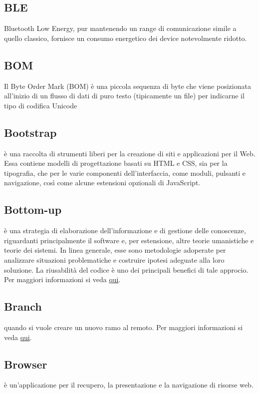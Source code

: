\documentclass[12pt,a4paper]{article}
\begin{document}
\subsection{BLE}
 Bluetooth Low Energy,  pur mantenendo un range di comunicazione simile a quello classico, fornisce un  consumo energetico dei device notevolmente ridotto.
 
 \subsection{BOM}
 Il Byte Order Mark (BOM) è una piccola sequenza di byte che viene posizionata all'inizio di un flusso di dati di puro testo (tipicamente un file) per indicarne il tipo di codifica Unicode

\subsection{Bootstrap}
è una raccolta di strumenti liberi per la creazione di siti e applicazioni per il Web. Essa contiene modelli di progettazione basati su HTML e CSS, sia per la tipografia, che per le varie componenti dell'interfaccia, come moduli, pulsanti e navigazione, così come alcune estensioni opzionali di JavaScript. 

\subsection{Bottom-up}
è una strategia di elaborazione dell'informazione e di gestione delle conoscenze, riguardanti principalmente il software e, per estensione, altre teorie umanistiche e teorie dei sistemi. In linea generale, esse sono metodologie adoperate per analizzare situazioni problematiche e costruire ipotesi adeguate alla loro soluzione. La riusabilità del codice è uno dei principali benefici di tale approcio. Per maggiori informazioni si veda \href{https://it.wikipedia.org/wiki/Progettazione_top-down_e_bottom-up}{qui}.

\subsection{Branch}
 quando si vuole creare un nuovo ramo al  remoto. Per maggiori informazioni si veda \href{https://git-scm.com/docs/}{qui}.

\subsection{Browser}
 è un'applicazione per il recupero, la presentazione e la navigazione di risorse web.
\end{document}
